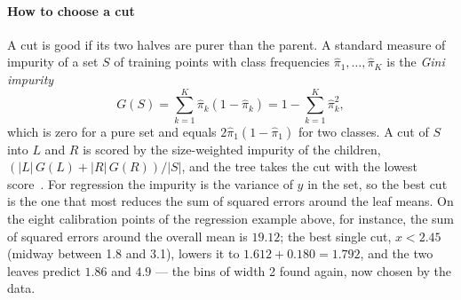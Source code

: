 \documentclass[11pt]{article}
\begin{document}
\paragraph{How to choose a cut} A cut is good if its two halves are purer than the parent. A standard measure of
impurity of a set $S$ of training points with class frequencies $\hat\pi_1, \dots, \hat\pi_K$ is the \emph{Gini impurity}
\[
  G(S) = \sum_{k=1}^K \hat\pi_k (1 - \hat\pi_k) = 1 - \sum_{k=1}^K \hat\pi_k^2 ,
\]
which is zero for a pure set and equals $2\hat\pi_1(1 - \hat\pi_1)$ for two classes. A cut of $S$ into $L$ and $R$ is scored by
the size-weighted impurity of the children, $(|L|\, G(L) + |R|\, G(R))/|S|$, and the tree takes the cut with the lowest
score~\cite{breiman1984}. For regression the impurity is the variance of $y$ in the set, so the best cut is the one
that most reduces the sum of squared errors around the leaf means. On the eight calibration points of the regression
example above, for instance, the sum of squared errors around the overall mean is $19.12$; the best single cut,
$x < 2.45$ (midway between 1.8 and 3.1), lowers it to $1.612 + 0.180 = 1.792$, and the two leaves predict $1.86$ and
$4.9$ --- the bins of width 2 found again, now chosen by the data.
\end{document}
